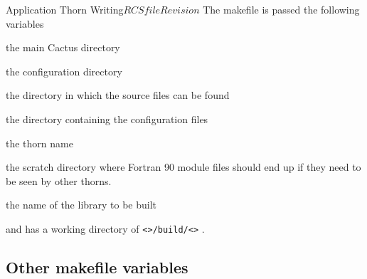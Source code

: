 \begin{cactuspart}{Application Thorn Writing}{$RCSfile$}{$Revision$}
The makefile is passed the following variables
\begin{Lentry}

\item [\texttt{\$(CCTK\_HOME)}]  the main Cactus directory

\item [\texttt{\$(TOP)}] the configuration directory

\item [\texttt{\$(SRCDIR)}] the directory in which the source files can be found

\item [\texttt{\$(CONFIG)}]  the directory containing the configuration files

\item [\texttt{\$(THORN)}]   the thorn name

\item [\texttt{\$(SCRATCH\_BUILD)}]  the scratch directory where Fortran 90 module
files should end up if they need to be seen by other thorns.

\item [\texttt{\$(NAME)}] the name of the library to be built

\end{Lentry}

and has a working directory of
\texttt{<>/build/<>} .

\subsection{Other makefile variables}


\end{cactuspart}
